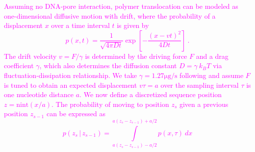 \documentclass{biophys_letter}
\newcommand{\bias}{\beta}
\newcommand{\jwm}[1]{\textcolor{Magenta}{#1}}
\begin{document}
\begin{multicols}{2}
\jwm{
Assuming no DNA-pore interaction, polymer translocation can be modeled as one-dimensional diffusive motion with drift, where the probability of a displacement $x$ over a time interval $t$ is given by
\begin{equation}
  p(x, t) 
  =  
  \frac{1}
       {\sqrt{4 \pi D t}}
  \exp 
  \left[ 
    - \frac{(x - v t)^2}
           {4 D t} 
  \right]
  ~.
\end{equation}
The drift velocity $v = F/\gamma$ is determined by the driving force $F$ and a drag coefficient $\gamma$, which also determines the diffusion constant $D = \gamma \: k_B T$ via fluctuation-dissipation relationship.
We take $\gamma = 1.27 \mathrm{\mu g/s}$ following \cite{Lu:2011} and assume $F$ is tuned to obtain an expected displacement $v \tau = a$ over the sampling interval $\tau$ is one nucleotide distance $a$. 
We now define a discretized sequence position $z = \mathrm{nint}(x / a)$. 
The probability of moving to position $z_s$ given a previous position $z_{s-1}$ can be expressed as
\begin{equation}
\label{eq:gaussian_kernel}
p(z_s \,|\, z_{s-1}) 
=
\int\limits_{a (z_s - z_{s-1}) - a/2}^{a (z_s - z_{s-1}) + a/2}
p(x, \tau) \: dx
\end{equation}
}




\end{multicols}
\end{document}
